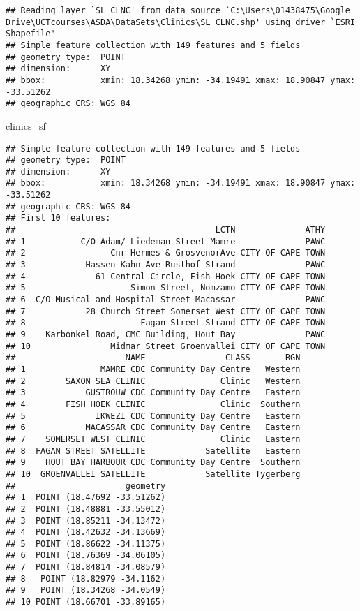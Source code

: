 \documentclass[
]{book}
\newenvironment{Shaded}{\begin{snugshade}}{\end{snugshade}}
\newcommand{\NormalTok}[1]{#1}
\begin{document}
\begin{verbatim}
## Reading layer `SL_CLNC' from data source `C:\Users\01438475\Google Drive\UCTcourses\ASDA\DataSets\Clinics\SL_CLNC.shp' using driver `ESRI Shapefile'
## Simple feature collection with 149 features and 5 fields
## geometry type:  POINT
## dimension:      XY
## bbox:           xmin: 18.34268 ymin: -34.19491 xmax: 18.90847 ymax: -33.51262
## geographic CRS: WGS 84
\end{verbatim}

\begin{Shaded}
\begin{Highlighting}[]
\NormalTok{clinics_sf}
\end{Highlighting}
\end{Shaded}

\begin{verbatim}
## Simple feature collection with 149 features and 5 fields
## geometry type:  POINT
## dimension:      XY
## bbox:           xmin: 18.34268 ymin: -34.19491 xmax: 18.90847 ymax: -33.51262
## geographic CRS: WGS 84
## First 10 features:
##                                        LCTN              ATHY
## 1           C/O Adam/ Liedeman Street Mamre              PAWC
## 2                 Cnr Hermes & GrosvenorAve CITY OF CAPE TOWN
## 3            Hassen Kahn Ave Rusthof Strand              PAWC
## 4              61 Central Circle, Fish Hoek CITY OF CAPE TOWN
## 5                     Simon Street, Nomzamo CITY OF CAPE TOWN
## 6  C/O Musical and Hospital Street Macassar              PAWC
## 7            28 Church Street Somerset West CITY OF CAPE TOWN
## 8                       Fagan Street Strand CITY OF CAPE TOWN
## 9    Karbonkel Road, CMC Building, Hout Bay              PAWC
## 10                Midmar Street Groenvallei CITY OF CAPE TOWN
##                      NAME                CLASS       RGN
## 1               MAMRE CDC Community Day Centre   Western
## 2        SAXON SEA CLINIC               Clinic   Western
## 3            GUSTROUW CDC Community Day Centre   Eastern
## 4        FISH HOEK CLINIC               Clinic  Southern
## 5              IKWEZI CDC Community Day Centre   Eastern
## 6            MACASSAR CDC Community Day Centre   Eastern
## 7    SOMERSET WEST CLINIC               Clinic   Eastern
## 8  FAGAN STREET SATELLITE            Satellite   Eastern
## 9    HOUT BAY HARBOUR CDC Community Day Centre  Southern
## 10  GROENVALLEI SATELLITE            Satellite Tygerberg
##                      geometry
## 1  POINT (18.47692 -33.51262)
## 2  POINT (18.48881 -33.55012)
## 3  POINT (18.85211 -34.13472)
## 4  POINT (18.42632 -34.13669)
## 5  POINT (18.86622 -34.11375)
## 6  POINT (18.76369 -34.06105)
## 7  POINT (18.84814 -34.08579)
## 8   POINT (18.82979 -34.1162)
## 9   POINT (18.34268 -34.0549)
## 10 POINT (18.66701 -33.89165)
\end{verbatim}
\end{document}
